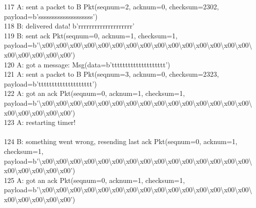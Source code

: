 \documentclass{article}
\begin{document}
{117 A: sent a packet to B Pkt(seqnum=2, acknum=0, checksum=2302,
payload=b'ssssssssssssssssssss') \\
118 B: delivered data! b'rrrrrrrrrrrrrrrrrrrr' \\
119 B: sent ack Pkt(seqnum=0, acknum=1, checksum=1,
payload=b'\textbackslash{}x00\textbackslash{}x00\textbackslash{}x00\textbackslash{}x00\textbackslash{}x00\textbackslash{}x00\textbackslash{}x00\textbackslash{}x00\textbackslash{}x00\textbackslash{}x00\textbackslash{}x00\textbackslash{}x00\textbackslash{}x00\textbackslash{}x00\textbackslash{}x00\textbackslash{}x00\textbackslash{}x00\textbackslash{}x00\textbackslash{}x00\textbackslash{}x00')
\\
120 A: got a message: Msg(data=b'tttttttttttttttttttt') \\
121 A: sent a packet to B Pkt(seqnum=3, acknum=0, checksum=2323,
payload=b'tttttttttttttttttttt') \\
122 A: got an ack Pkt(seqnum=0, acknum=1, checksum=1,
payload=b'\textbackslash{}x00\textbackslash{}x00\textbackslash{}x00\textbackslash{}x00\textbackslash{}x00\textbackslash{}x00\textbackslash{}x00\textbackslash{}x00\textbackslash{}x00\textbackslash{}x00\textbackslash{}x00\textbackslash{}x00\textbackslash{}x00\textbackslash{}x00\textbackslash{}x00\textbackslash{}x00\textbackslash{}x00\textbackslash{}x00\textbackslash{}x00\textbackslash{}x00')
\\
123 A: restarting timer! \\
 \\
124 B: something went wrong, resending last ack Pkt(seqnum=0, acknum=1,
checksum=1,
payload=b'\textbackslash{}x00\textbackslash{}x00\textbackslash{}x00\textbackslash{}x00\textbackslash{}x00\textbackslash{}x00\textbackslash{}x00\textbackslash{}x00\textbackslash{}x00\textbackslash{}x00\textbackslash{}x00\textbackslash{}x00\textbackslash{}x00\textbackslash{}x00\textbackslash{}x00\textbackslash{}x00\textbackslash{}x00\textbackslash{}x00\textbackslash{}x00\textbackslash{}x00')
\\
125 A: got an ack Pkt(seqnum=0, acknum=1, checksum=1,
payload=b'\textbackslash{}x00\textbackslash{}x00\textbackslash{}x00\textbackslash{}x00\textbackslash{}x00\textbackslash{}x00\textbackslash{}x00\textbackslash{}x00\textbackslash{}x00\textbackslash{}x00\textbackslash{}x00\textbackslash{}x00\textbackslash{}x00\textbackslash{}x00\textbackslash{}x00\textbackslash{}x00\textbackslash{}x00\textbackslash{}x00\textbackslash{}x00\textbackslash{}x00')
\\
}
\end{document}
